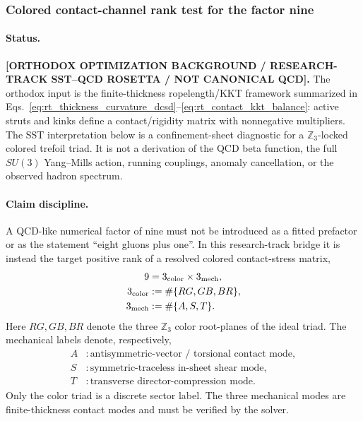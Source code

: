 \subsubsection{Colored contact-channel rank test for the factor nine}
\label{sec:rt_colored_contact_rank_nine}

\paragraph{Status.}
\textbf{[ORTHODOX OPTIMIZATION BACKGROUND / RESEARCH-TRACK SST--QCD ROSETTA / NOT CANONICAL QCD].}
The orthodox input is the finite-thickness ropelength/KKT framework summarized in
Eqs.~\eqref{eq:rt_thickness_curvature_dcsd}--\eqref{eq:rt_contact_kkt_balance}: active
struts and kinks define a contact/rigidity matrix with nonnegative multipliers.
The SST interpretation below is a confinement-sheet diagnostic for a
\(\mathbb Z_3\)-locked colored trefoil triad.  It is not a derivation of the QCD
beta function, the full \(SU(3)\) Yang--Mills action, running couplings, anomaly
cancellation, or the observed hadron spectrum.

\paragraph{Claim discipline.}
A QCD-like numerical factor of nine must not be introduced as a fitted prefactor
or as the statement ``eight gluons plus one''.  In this research-track bridge it
is instead the target positive rank of a resolved colored contact-stress matrix,
\begin{align}
    9
    &=
    3_{\rm color}\times 3_{\rm mech},
    \label{eq:rt_rank9_factorization}\\
    3_{\rm color}
    &:=
    \#\{RG,GB,BR\},\\
    3_{\rm mech}
    &:=
    \#\{A,S,T\}.
\end{align}
Here \(RG,GB,BR\) denote the three \(\mathbb Z_3\) color root-planes of the
ideal triad.  The mechanical labels denote, respectively,
\begin{align}
    A&: \text{antisymmetric-vector / torsional contact mode},\\
    S&: \text{symmetric-traceless in-sheet shear mode},\\
    T&: \text{transverse director-compression mode}.
\end{align}
Only the color triad is a discrete sector label.  The three mechanical modes are
finite-thickness contact modes and must be verified by the solver.

